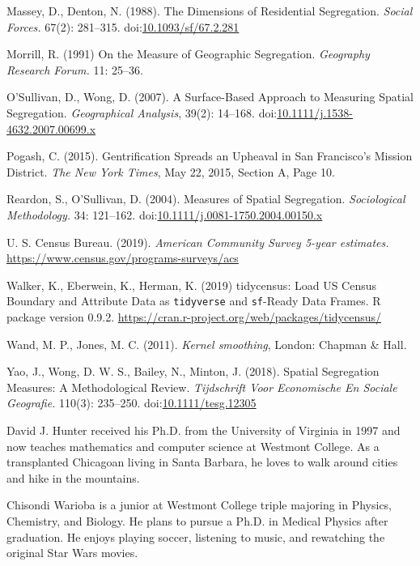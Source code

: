 \documentclass{article}
\theoremstyle{theorem}
\theoremstyle{definition}
\begin{document}
\begin{thebibliography}{3}
 Massey, D., Denton, N. (1988). The Dimensions of Residential Segregation. \textit{Social Forces.} 67(2): 281--315. doi:\href{http://dx.doi.org/10.1093/sf/67.2.281}{10.1093/sf/67.2.281}

 Morrill, R. (1991) On the Measure of Geographic Segregation. \textit{Geography Research Forum.} 11: 25--36.

 O'Sullivan, D., Wong, D. (2007). A Surface-Based Approach to Measuring Spatial Segregation. \textit{Geographical Analysis}, 39(2): 14--168. doi:\href{http://dx.doi.org/10.1111/j.1538-4632.2007.00699.x}{10.1111/j.1538-4632.2007.00699.x}

Pogash, C. (2015). Gentrification Spreads an Upheaval in San Francisco's Mission District. \textit{The New York Times}, May 22, 2015, Section A, Page 10.

Reardon, S., O'Sullivan, D. (2004). Measures of Spatial Segregation. \textit{Sociological Methodology.} 34: 121--162. doi:\href{http://dx.doi.org/10.1111/j.0081-1750.2004.00150.x}{10.1111/j.0081-1750.2004.00150.x}

 U. S. Census Bureau. (2019). \textit{American Community Survey 5-year estimates.} \href{https://www.census.gov/programs-surveys/acs}{\url{https://www.census.gov/programs-surveys/acs}}

 Walker, K., Eberwein, K., Herman, K. (2019) tidycensus: Load US Census Boundary and Attribute Data as \texttt{tidyverse} and \texttt{sf}-Ready Data Frames. R package version 0.9.2. \href{https://cran.r-project.org/web/packages/tidycensus}{\url{https://cran.r-project.org/web/packages/tidycensus/}}

 Wand, M. P., Jones, M. C. (2011). \textit{Kernel smoothing}, London: Chapman \& Hall.

 Yao, J., Wong, D. W. S., Bailey, N., Minton, J. (2018). Spatial Segregation Measures: A Methodological Review. \textit{Tijdschrift Voor Economische En Sociale Geografie.} 110(3): 235--250. doi:\href{https://doi.org/10.1111/tesg.12305}{10.1111/tesg.12305}

\end{thebibliography}

\begin{biog}
\item[David J. Hunter] received his Ph.D. from the University of Virginia in 1997 and now teaches mathematics and computer science at Westmont College. As a transplanted Chicagoan living in Santa Barbara, he loves to walk around cities and hike in the mountains.

\item[Chisondi Warioba] is a junior at Westmont College triple majoring in Physics, Chemistry, and Biology. He plans to pursue a Ph.D. in Medical Physics after graduation. He enjoys playing soccer, listening to music, and rewatching the original Star Wars movies.
\end{biog}
\end{document}
